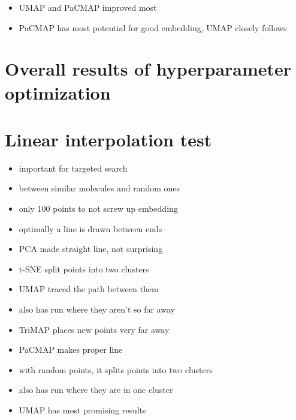 \begin{itemize}
	\item UMAP and PaCMAP improved most
	\item PaCMAP has most potential for good embedding, UMAP closely follows
\end{itemize}

\section{Overall results of hyperparameter optimization}\label{sec:overall-results-of-hyperparameter-optimization}


\section{Linear interpolation test}\label{sec:linear-interpolation-test}

\begin{itemize}
	\item important for targeted search
	\item between similar molecules and random ones
	\item only 100 points to not screw up embedding
	\item optimally a line is drawn  between ends
	\item PCA made straight line, not surprising
	\item t-SNE split points into two clusters
	\item UMAP traced the path between them
	\item also has run where they aren't so far away
	\item TriMAP places new points very far away
	\item PaCMAP makes proper line
	\item with random points, it splits points into two clusters
	\item also has run where they are in one cluster
	\item UMAP has most promising results
\end{itemize}

